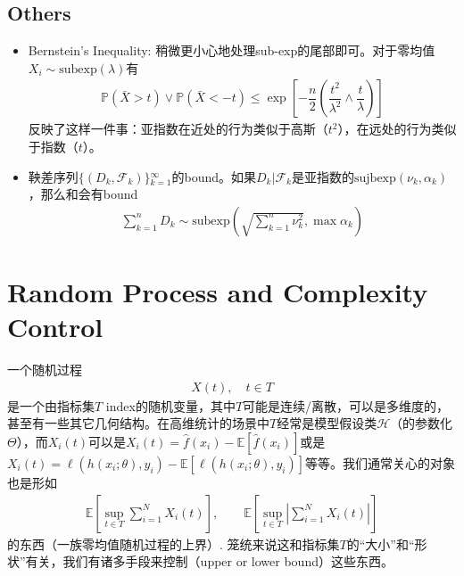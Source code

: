 \documentclass[11pt,a4paper]{ctexart}
\numberwithin{equation}{section}%
\begin{document}
\subsection{Others}
\begin{itemize}[topsep=2pt,itemsep=0pt]
    \item Bernstein's Inequality: 稍微更小心地处理sub-exp的尾部即可。对于零均值$ X_i\sim \mathrm{ subexp }(\lambda )  $有
    \begin{align*}
        \mathbb{P}\left( \bar{X}>t \right) \vee \mathbb{P}\left( \bar{X}<-t \right) \leq \exp [-\dfrac{ n  }{ 2 } (\dfrac{ t^2 }{ \lambda ^2 } \wedge \dfrac{ t }{ \lambda } )]   
    \end{align*}
    反映了这样一件事：亚指数在近处的行为类似于高斯（$ t^2 $），在远处的行为类似于指数（$ t $）。
    \item 鞅差序列$ \{(D_k,\mathcal{F}_k)\}{_{k=1}^\infty} $的bound。如果$ D_k|\mathcal{F}_k $是亚指数的$ \mathrm{sujbexp}(\nu _k, \alpha _k) $，那么和会有bound
    \begin{align*}
        \sum_{k=1}^n D_k \sim \mathrm{subexp}( \sqrt{ \sum_{k=1}^n \nu _k^2 }, \max \alpha _k )
    \end{align*}
    
    
    
    
\end{itemize}

    
\section{Random Process and Complexity Control}

一个随机过程
\begin{align*}
    X(t),\quad t\in T 
\end{align*}
是一个由指标集$ T $ index的随机变量，其中$ T $可能是连续/离散，可以是多维度的，甚至有一些其它几何结构。在高维统计的场景中$ T $经常是模型假设类$ \mathcal{H} $（的参数化$ \Theta $），而$ X_i(t) $可以是$ X_i(t)=\hat{f}(x_i)-\mathbb{E}\left[ \hat{f}(x_i) \right]  $或是$ X_i(t)=\ell(h(x_i;\theta),y_i)-\mathbb{E}\left[ \ell(h(x_i;\theta),y_i) \right]  $等等。我们通常关心的对象也是形如
\begin{align*}
    \mathbb{E}\left[ \mathop{ \sup }\limits_{t\in T} \sum_{i=1}^N X_i(t)  \right]  ,\qquad \mathbb{E}\left[ \mathop{ \sup }\limits_{t\in T} \left\vert \sum_{i=1}^N X_i(t) \right\vert  \right]
\end{align*}
的东西（一族零均值随机过程的上界）. 笼统来说这和指标集$ T $的“大小”和“形状”有关，我们有诸多手段来控制（upper or lower bound）这些东西。
\end{document}
